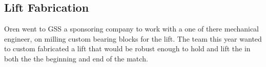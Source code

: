 \documentclass{article}
\begin{document}
\subsection{Lift Fabrication}
Oren went to GSS a sponsoring company to work with a one of there mechanical engineer, on milling custom bearing blocks for the lift. The team this year wanted to custom fabricated a lift that would be robust enough to hold and lift the in both the the beginning and end of the match. 
\end{document}

